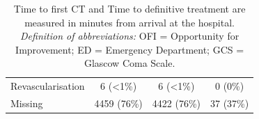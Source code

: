 \documentclass[12pt, a4paper]{article}
\begin{document}
\begin{appendices}
\begin{table}[t!]
{\begin{tabular}{lccc}
                \hspace{3mm}Revascularisation                 & 6 (\textless1\%)  & 6 (\textless1\%)  & 0 (0\%)       \\
                \hspace{3mm}Missing                           & 4459 (76\%)       & 4422 (76\%)       & 37 (37\%)     \\
                \bottomrule
            \end{tabular}
        }
        \caption*{\small Time to first CT and Time to definitive treatment are measured in minutes from arrival at the hospital.\\
            \textit{Definition of abbreviations:} OFI = Opportunity for Improvement; ED = Emergency Department; GCS = Glascow Coma Scale.}
    \end{table}
\end{appendices}
\end{document}
